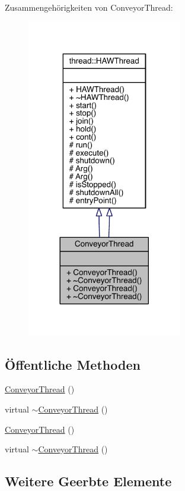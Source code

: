 Zusammengehörigkeiten von Conveyor\+Thread\+:\nopagebreak
\begin{figure}[H]
\begin{center}
\leavevmode
\includegraphics[width=192pt]{class_conveyor_thread__coll__graph}
\end{center}
\end{figure}
\subsection*{Öffentliche Methoden}
\begin{DoxyCompactItemize}
\item 
\hyperlink{class_conveyor_thread_a2068e0741d46acdd2738d65447b594b6}{Conveyor\+Thread} ()
\item 
virtual \hyperlink{class_conveyor_thread_ac496ae2a4708c7cd3af20721c1bf8b8a}{$\sim$\+Conveyor\+Thread} ()
\item 
\hyperlink{class_conveyor_thread_a2068e0741d46acdd2738d65447b594b6}{Conveyor\+Thread} ()
\item 
virtual \hyperlink{class_conveyor_thread_a5b1ce529cc5e10c9b97a81c621b61f1c}{$\sim$\+Conveyor\+Thread} ()
\end{DoxyCompactItemize}
\subsection*{Weitere Geerbte Elemente}


